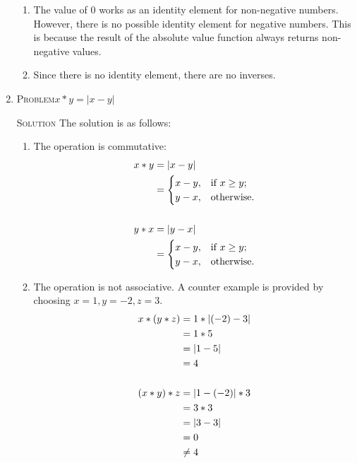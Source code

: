 \documentclass{amsart}
\newcommand{\Solution}{\textsc{Solution}\xspace}
\newcommand{\Problem}{\textsc{Problem}\xspace}
\begin{document}
\begin{enumerate}
\begin{enumerate}
      \item The value of $0$ works as an identity element for non-negative
         numbers. However, there is no possible identity element for negative
         numbers. This is because the result of the absolute value
	 function always returns non-negative values.

      \item Since there is no identity element, there are no inverses.

   \end{enumerate}


   \item \Problem $x * y = | x - y |$

   \noindent \Solution The solution is as follows:
   \begin{enumerate}

      \item The operation is commutative:
      \begin{align*}
         x * y & = | x - y |           \\
	       & =
	       \begin{cases}
	          x - y,     & \text{if $x \ge y$;} \\
		  y - x,     & \text{otherwise.}
	       \end{cases} \notag \\
	                                         \notag \\
	 y * x & = | y - x |           \\
	       & =
	       \begin{cases}
	          x - y,     & \text{if $x \ge y$;} \\
		  y - x,     & \text{otherwise.}
	       \end{cases} \notag 
      \end{align*}

      \item The operation is not associative. A counter example is provided
      by choosing $x = 1, y = -2, z = 3$.
      \begin{align*}
         x * (y * z) & = 1 * |(-2) - 3|    \\
	             & = 1 * 5       \notag \\
		     & = | 1 - 5 |   \notag \\
		     & = 4           \notag \\
		                     \notag \\
	 (x * y) * z & = | 1 - (-2) | * 3  \\
	             & = 3 * 3       \notag \\
		     & = | 3 - 3 |   \notag \\
		     & = 0           \notag \\
		     & \ne 4         \notag
      \end{align*}


\end{enumerate}
\end{enumerate}
\end{document}
